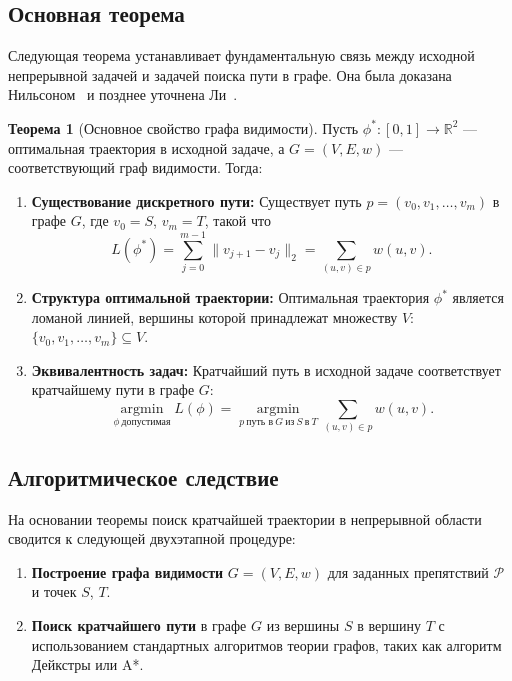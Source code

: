 \documentclass[intlimits,twoside,a4paper,11pt]{article}
\theoremstyle{definition}
\newtheorem{theorem}{Теорема}[section]
\begin{document}
\subsection{Основная теорема}

Следующая теорема устанавливает фундаментальную связь между исходной непрерывной задачей и задачей поиска пути в графе.
Она была доказана Нильсоном~\cite{nilsson69} и позднее уточнена Ли~\cite{lee78}.

\begin{theorem}[Основное свойство графа видимости]
Пусть $\phi^*: [0,1] \to \mathbb{R}^2$ --- оптимальная траектория в исходной задаче, а $G = (V, E, w)$ --- соответствующий граф видимости. Тогда:
\begin{enumerate}
    \item[\textbf{(1)}]\textbf{Существование дискретного пути:} Существует путь $p = (v_0, v_1, \dots, v_m)$ в графе $G$, где $v_0 = S$, $v_m = T$, такой что
    \[
    L(\phi^*) = \sum_{j=0}^{m-1} \|v_{j+1} - v_j\|_2 = \sum_{(u,v) \in p} w(u,v).
    \]
    
    \item[\textbf{(2)}]\textbf{Структура оптимальной траектории:} Оптимальная траектория $\phi^*$ является ломаной линией,
        вершины которой принадлежат множеству $V$: $\{v_0, v_1, \dots, v_m\} \subseteq V$.
    
    \item[\textbf{(3)}] \textbf{Эквивалентность задач:} Кратчайший путь в исходной задаче соответствует кратчайшему пути в графе $G$:
    \[
    \operatorname*{argmin}_{\phi \ \text{допустимая}} L(\phi) = \operatorname*{argmin}_{p \ \text{путь в} \ G \ \text{из} \ S \ \text{в} \ T} \sum_{(u,v) \in p} w(u,v).
    \]
\end{enumerate}
\end{theorem}

\subsection{Алгоритмическое следствие}

На основании теоремы поиск кратчайшей траектории в непрерывной области сводится к следующей двухэтапной процедуре:

\begin{enumerate}
    \item \textbf{Построение графа видимости} $G = (V, E, w)$ для заданных препятствий $\mathcal{P}$ и точек $S$, $T$.
    \item \textbf{Поиск кратчайшего пути} в графе $G$ из вершины $S$ в вершину $T$ с использованием стандартных алгоритмов теории графов, 
        таких как алгоритм Дейкстры или A*.
\end{enumerate}
\end{document}
